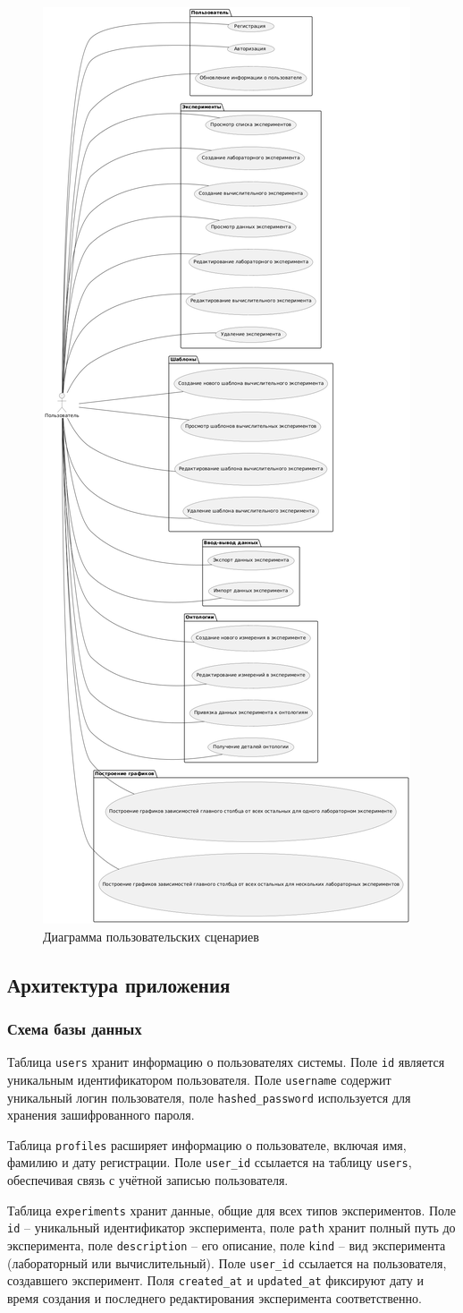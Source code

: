\begin{figure}[H]
    \centering
    \includegraphics[width=0.35\linewidth]{img/use_cases.png}
    \caption{Диаграмма пользовательских сценариев}
    \label{pic:uc}
\end{figure}

\subsection{Архитектура приложения}

\subsubsection{Схема базы данных}

Таблица \texttt{users} хранит информацию о пользователях системы. Поле \texttt{id} является уникальным идентификатором пользователя. Поле \texttt{username} содержит уникальный логин пользователя, поле \texttt{hashed\_password} используется для хранения зашифрованного пароля.

Таблица \texttt{profiles} расширяет информацию о пользователе, включая имя, фамилию и дату регистрации. Поле \texttt{user\_id} ссылается на таблицу \texttt{users}, обеспечивая связь с учётной записью пользователя.

Таблица \texttt{experiments} хранит данные, общие для всех типов экспериментов. Поле \texttt{id} -- уникальный идентификатор эксперимента, поле \texttt{path} хранит полный путь до эксперимента, поле \texttt{description} -- его описание, поле \texttt{kind} -- вид эксперимента (лабораторный или вычислительный). Поле \texttt{user\_id} ссылается на пользователя, создавшего эксперимент. Поля \texttt{created\_at} и \texttt{updated\_at} фиксируют дату и время создания и последнего редактирования эксперимента соответственно.

